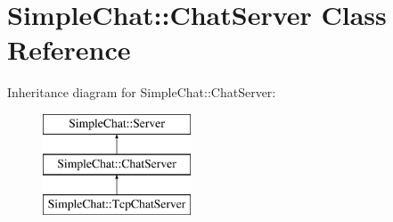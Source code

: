 \hypertarget{classSimpleChat_1_1ChatServer}{\section{Simple\-Chat\-:\-:Chat\-Server Class Reference}
\label{classSimpleChat_1_1ChatServer}
}
Inheritance diagram for Simple\-Chat\-:\-:Chat\-Server\-:\begin{figure}[H]
\begin{center}
\leavevmode
\includegraphics[height=3.000000cm]{classSimpleChat_1_1ChatServer}
\end{center}
\end{figure}
